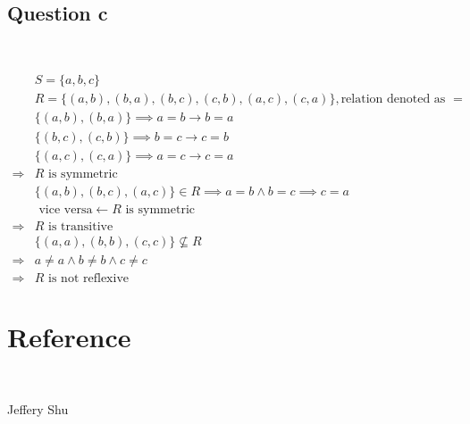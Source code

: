 \documentclass{article}
\begin{document}
~

\subsection*{Question c}

~

\begin{equation*}
    \begin{split}
        &S=\{a,b,c\}\\
        &R=\{(a,b),(b,a),(b,c),(c,b),(a,c),(c,a)\},\text{relation denoted as }=\\
        &\{(a,b),(b,a)\}\implies a= b\rightarrow b= a\\
        &\{(b,c),(c,b)\}\implies b= c\rightarrow c= b\\
        &\{(a,c),(c,a)\}\implies a= c\rightarrow c= a\\
        \Rightarrow&R\text{ is symmetric}\\
        &\{(a,b),(b,c),(a,c)\}\in R\implies a=b\land b=c\implies c=a\\
        &\text{ vice versa}\leftarrow R\text{ is symmetric}\\
        \Rightarrow&R\text{ is transitive}\\
        &\{(a,a),(b,b),(c,c)\}\nsubseteq R\\
        \Rightarrow& a\ne a\land b\ne b\land c\ne c\\
        \Rightarrow&R\text{ is not reflexive}
    \end{split}
\end{equation*}

\newpage

\section*{Reference}

~

Jeffery Shu
\end{document}
